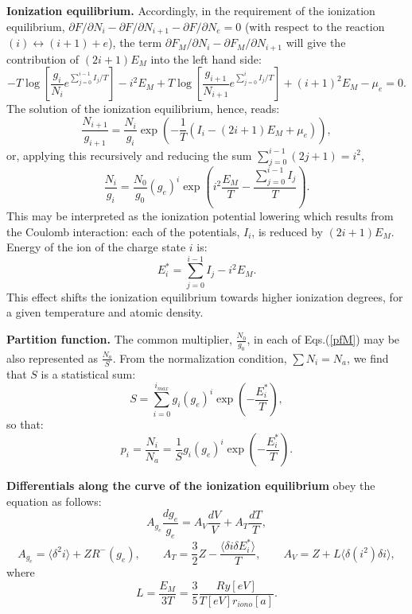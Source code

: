 {\bf Ionization equilibrium.} Accordingly, in the requirement of the ionization equilibrium, $\partial F/\partial N_i - \partial F/\partial N_{i+1} - \partial F/\partial N_e = 0$ (with respect to the reaction $(i)\leftrightarrow(i+1)+e$),
the term $\partial F_{M}/\partial N_i -\partial F_{M}/\partial N_{i+1}$ will 
give the contribution of $(2i+1) E_M$ into the left hand side:
\begin{equation}
-T \log \left[ \frac{g_i}    {N_i}     e^{\sum_{j=0}^{i-1} I_j/T} \right] - i^2 E_M
+T \log \left[ \frac{g_{i+1}}{N_{i+1}} e^{\sum_{j=0}^i     I_j/T} \right] + (i+1)^2 E_M
-\mu_e = 0.
\end{equation}
The solution of the ionization equilibrium, hence, reads:
\begin{equation}
\frac{N_{i+1}}{g_{i+1}} = \frac{N_i}{g_i} \exp\left(-\frac1T \left(I_i - (2i+1) E_M + \mu_e \right)\right),
\end{equation}
or, applying this recursively and reducing the sum $\sum_{j=0}^{i-1} (2j+1) = i^2$,
\begin{equation}\label{pfM}
\frac{N_i}{g_i}=\frac{N_0}{g_0}(g_e)^i \exp \left( i^2 \frac{E_M}{T} -\frac{\sum_{j=0}^{i-1}I_j}T \right) .
\end{equation}
This may be interpreted as the ionization potential lowering which results from the Coulomb interaction:
each of the potentials, $I_i$, is reduced by $(2i+1)E_M$.
Energy of the ion of the charge state $i$ is:
\begin{equation}\label{estar}
E_i^* = \sum_{j=0}^{i-1}I_j - i^2 E_M.
\end{equation}
This effect shifts the ionization equilibrium towards higher ionization degrees, for a given temperature and atomic density.

{\bf Partition function.} The common multiplier, $\frac{N_0}{g_0}$, in each of Eqs.(\ref{pfM}) may be also represented as $\frac{N_a}{S}$.
From the normalization condition, $\sum N_i = N_a$, we find that $S$ is a statistical sum:
\begin{equation}\label{MadS}
S=\sum_{i=0}^{i_{max}} g_i (g_e)^i \exp\left(-\frac{E_i^*}T\right),
\end{equation}
so that:
\begin{equation}\label{ni}
p_i = \frac{N_i}{N_a} = \frac{1}S g_i (g_e)^i \exp \left( -\frac{E_i^*}T \right).
\end{equation}

{\bf Differentials along the curve of the ionization equilibrium} obey the equation as follows:
\begin{equation}\label{diffstruct}
A_{g_e} \frac{dg_e}{g_e} = A_V \frac{dV}{V} + A_T \frac{dT}{T},
\end{equation}
\begin{equation}
A_{g_e} = \langle \delta^2 i \rangle + ZR^-(g_e), \qquad
A_T     = \frac32 Z - \frac{\langle \delta i \delta E^*_i \rangle}{T}, \qquad
A_V     = Z + L \langle \delta(i^2) \delta i \rangle,
\end{equation}
where 
\begin{equation}
L   = \frac{E_M}{3T} = \frac35 \frac{Ry[eV]}{T[eV] r_{iono}[a]}.
\end{equation}


